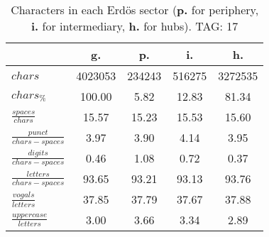 \begin{table}[h!]
\begin{center}
\begin{tabular}{| l | c | c | c | c |}\hline
 & g. & p. & i. & h. \\\hline
$chars$ & 4023053  & 234243  & 516275  & 3272535 \\\hline
$chars_{\%}$ & 100.00  & 5.82  & 12.83  & 81.34 \\\hline
$\frac{spaces}{chars}$ & 15.57  & 15.23  & 15.53  & 15.60 \\\hline
$\frac{punct}{chars-spaces}$ & 3.97  & 3.90  & 4.14  & 3.95 \\\hline
$\frac{digits}{chars-spaces}$ & 0.46  & 1.08  & 0.72  & 0.37 \\\hline
$\frac{letters}{chars-spaces}$ & 93.65  & 93.21  & 93.13  & 93.76 \\\hline
$\frac{vogals}{letters}$ & 37.85  & 37.79  & 37.67  & 37.88 \\\hline
$\frac{uppercase}{letters}$ & 3.00  & 3.66  & 3.34  & 2.89 \\\hline
\end{tabular}
\caption{Characters in each Erd\"os sector ({{\bf p.}} for periphery, {{\bf i.}} for intermediary, 
    {{\bf h.}} for hubs). TAG: 17}
\end{center}
\end{table}